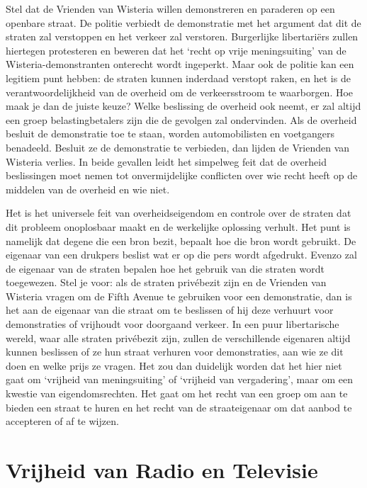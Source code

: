 \documentclass[
  a5paper,
  smalldemyvopaper,10pt,twoside,onecolumn,openright,extrafontsizes,hidelinks]{memoir}
\begin{document}
Stel dat de Vrienden van Wisteria willen demonstreren en paraderen op
een openbare straat. De politie verbiedt de demonstratie met het
argument dat dit de straten zal verstoppen en het verkeer zal verstoren.
Burgerlijke libertariërs zullen hiertegen protesteren en beweren dat het
`recht op vrije meningsuiting' van de Wisteria-demonstranten onterecht
wordt ingeperkt. Maar ook de politie kan een legitiem punt hebben: de
straten kunnen inderdaad verstopt raken, en het is de
verantwoordelijkheid van de overheid om de verkeersstroom te waarborgen.
Hoe maak je dan de juiste keuze? Welke beslissing de overheid ook neemt,
er zal altijd een groep belastingbetalers zijn die de gevolgen zal
ondervinden. Als de overheid besluit de demonstratie toe te staan,
worden automobilisten en voetgangers benadeeld. Besluit ze de
demonstratie te verbieden, dan lijden de Vrienden van Wisteria verlies.
In beide gevallen leidt het simpelweg feit dat de overheid beslissingen
moet nemen tot onvermijdelijke conflicten over wie recht heeft op de
middelen van de overheid en wie niet.

Het is het universele feit van overheidseigendom en controle over de
straten dat dit probleem onoplosbaar maakt en de werkelijke oplossing
verhult. Het punt is namelijk dat degene die een bron bezit, bepaalt hoe
die bron wordt gebruikt. De eigenaar van een drukpers beslist wat er op
die pers wordt afgedrukt. Evenzo zal de eigenaar van de straten bepalen
hoe het gebruik van die straten wordt toegewezen. Stel je voor: als de
straten privébezit zijn en de Vrienden van Wisteria vragen om de Fifth
Avenue te gebruiken voor een demonstratie, dan is het aan de eigenaar
van die straat om te beslissen of hij deze verhuurt voor demonstraties
of vrijhoudt voor doorgaand verkeer. In een puur libertarische wereld,
waar alle straten privébezit zijn, zullen de verschillende eigenaren
altijd kunnen beslissen of ze hun straat verhuren voor demonstraties,
aan wie ze dit doen en welke prijs ze vragen. Het zou dan duidelijk
worden dat het hier niet gaat om `vrijheid van meningsuiting' of
`vrijheid van vergadering', maar om een kwestie van eigendomsrechten.
Het gaat om het recht van een groep om aan te bieden een straat te huren
en het recht van de straateigenaar om dat aanbod te accepteren of af te
wijzen.

\section{Vrijheid van Radio en
Televisie}\label{vrijheid-van-radio-en-televisie}
\end{document}
